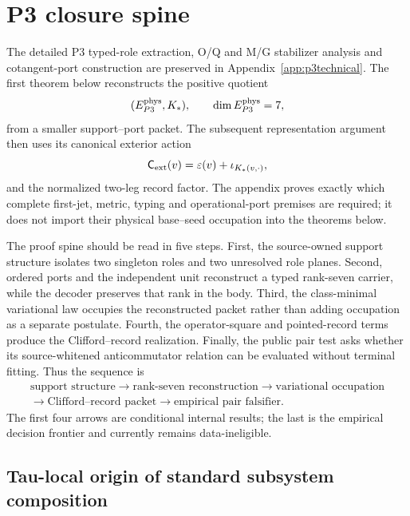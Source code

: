 \section{P3 closure spine}
\label{sec:p3closurespine}

The detailed P3 typed-role extraction, O/Q and M/G stabilizer analysis and
cotangent-port construction are preserved in
Appendix~\ref{app:p3technical}.  The first theorem below reconstructs the
positive quotient
\[
 (E_{P3}^{\rm phys},K_*),\qquad \dim E_{P3}^{\rm phys}=7,
\]
from a smaller support--port packet.  The subsequent representation argument
then uses its canonical exterior action
\[
 \mathsf C_{\rm ext}(v)=\varepsilon(v)
 +\iota_{K_*(v,\cdot)},
\]
and the normalized two-leg record factor.  The appendix proves exactly which
complete first-jet, metric, typing and operational-port premises are required;
it does not import their physical base--seed occupation into the theorems
below.

The proof spine should be read in five steps.  First, the source-owned support
structure isolates two singleton roles and two unresolved role planes.
Second, ordered ports and the independent unit reconstruct a typed rank-seven
carrier, while the decoder preserves that rank in the body.  Third, the
class-minimal variational law occupies the reconstructed packet rather than
adding occupation as a separate postulate.  Fourth, the operator-square and
pointed-record terms produce the Clifford--record realization.  Finally, the
public pair test asks whether its source-whitened anticommutator relation can
be evaluated without terminal fitting.  Thus the sequence is
\[
 \begin{gathered}
 \text{support structure}
 \longrightarrow \text{rank-seven reconstruction}
 \longrightarrow \text{variational occupation}
 \\
 \longrightarrow \text{Clifford--record packet}
 \longrightarrow \text{empirical pair falsifier}.
 \end{gathered}
\]
The first four arrows are conditional internal results; the last is the
empirical decision frontier and currently remains data-ineligible.

\subsection{Tau-local origin of standard subsystem composition}
\label{sec:taustandardcomposition}

